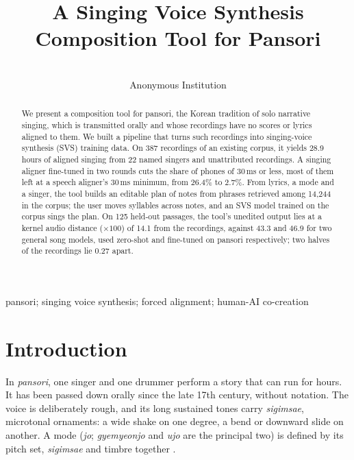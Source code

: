 \documentclass[wcp]{jmlr}
\title[A Singing Voice Synthesis Composition Tool for Pansori]{A Singing Voice Synthesis Composition Tool for Pansori}
\author{\Name{Anonymous Author} \Email{}\\ \addr Anonymous Institution}
\begin{document}
\makeatletter
\let \@jmlrpages \@empty
\makeatother

\maketitle

\begin{abstract}
We present a composition tool for pansori, the Korean tradition of solo narrative singing,
which is transmitted orally and whose recordings have no scores or lyrics aligned to them.
We built a pipeline that turns such recordings into singing-voice synthesis (SVS) training
data. On 387 recordings of an existing corpus, it yields 28.9 hours of aligned singing from
22 named singers and unattributed recordings. A singing aligner fine-tuned in two rounds
cuts the share of phones of 30\,ms or less, most of them left at a speech aligner's
30\,ms minimum, from 26.4\% to 2.7\%. From lyrics, a mode and a singer, the tool builds an
editable plan of notes from phrases retrieved among 14,244 in the corpus; the user moves
syllables across notes, and an SVS model trained on the corpus sings the plan. On 125
held-out passages, the tool's unedited output lies at a kernel audio distance
($\times 100$) of 14.1 from the recordings, against 43.3 and 46.9 for two general song
models, used zero-shot and fine-tuned on pansori respectively; two halves of the
recordings lie 0.27 apart.
\end{abstract}

\begin{keywords}
pansori; singing voice synthesis; forced alignment; human-AI co-creation
\end{keywords}

\section{Introduction}
In \emph{pansori}, one singer and one drummer perform a story that can run for hours.
It has been passed down orally since the late 17th century, without notation. The voice is deliberately rough,
and its long sustained tones carry \emph{sigimsae}, microtonal ornaments: a wide shake on one degree, a bend or downward slide on another. A mode (\emph{jo}; \emph{gyemyeonjo} and \emph{ujo} are the principal two) is defined by its pitch set, \emph{sigimsae} and timbre together
\citep{park2026frame}.
\end{document}
